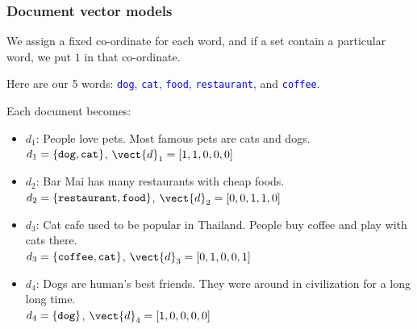 \begin{frame}
  \frametitle{Document vector models}

  We assign a fixed co-ordinate for each word, and if a set contain a particular word, we put $1$ in that co-ordinate.

  \pause Here are our 5 words: \textcolor{blue}{{\tt dog}, {\tt cat},
    {\tt food}, {\tt restaurant},} and \textcolor{blue}{\tt coffee}.

  Each document becomes:

  \begin{itemize}
  \item $d_1$: {\tiny People love pets.  Most famous pets are cats and
    dogs.} \\
    $d_1=\{\mbox{\tt dog}, \mbox{\tt cat}\}$,
    \pause $\vect{d}_1=[1,1,0,0,0]$
    \pause
  \item $d_2$: {\tiny Bar Mai has many restaurants with cheap foods.} \\
    $d_2=\{\mbox{\tt restaurant}, \mbox{\tt food}\}$,
    \pause $\vect{d}_2=[0,0,1,1,0]$
    \pause
  \item $d_3$: {\tiny Cat cafe used to be popular in Thailand.  People
    buy coffee and play with cats there.} \\
    $d_3=\{\mbox{\tt coffee}, \mbox{\tt cat}\}$,
    \pause $\vect{d}_3=[0,1,0,0,1]$
    \pause
  \item $d_4$: {\tiny Dogs are human's best friends.  They were around
    in civilization for a long long time.} \\
    $d_4=\{\mbox{\tt dog}\}$,
    \pause $\vect{d}_4=[1,0,0,0,0]$
  \end{itemize}

\end{frame}

